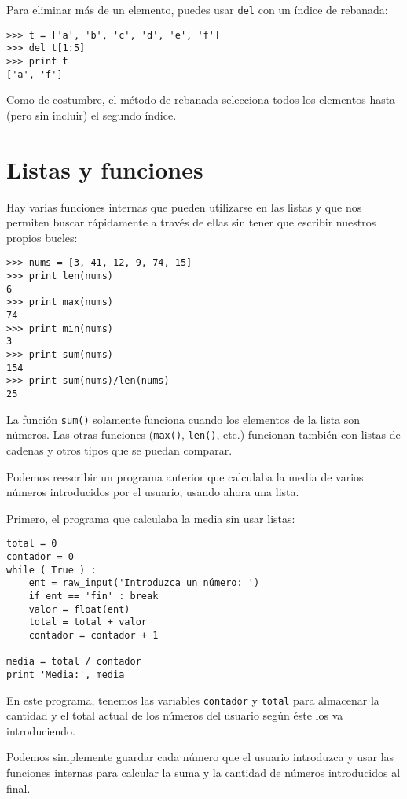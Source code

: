 Para eliminar más de un elemento, puedes usar {\tt del} con
un índice de rebanada:

\beforeverb
\begin{verbatim}
>>> t = ['a', 'b', 'c', 'd', 'e', 'f']
>>> del t[1:5]
>>> print t
['a', 'f']
\end{verbatim}
\afterverb
%
Como de costumbre, el método de rebanada selecciona todos los elementos hasta (pero
sin incluir) el segundo índice.

\section{Listas y funciones}

Hay varias funciones internas que pueden utilizarse en las listas
y que nos permiten buscar rápidamente a través de ellas
sin tener que escribir nuestros propios bucles:

\beforeverb
\begin{verbatim}
>>> nums = [3, 41, 12, 9, 74, 15]
>>> print len(nums)
6
>>> print max(nums)
74
>>> print min(nums)
3
>>> print sum(nums)
154
>>> print sum(nums)/len(nums)
25
\end{verbatim}
\afterverb
%
La función {\tt sum()} solamente funciona cuando los elementos de la lista son números.
Las otras funciones ({\tt max()}, {\tt len()}, etc.) funcionan también con listas
de cadenas y otros tipos que se puedan comparar.

Podemos reescribir un programa anterior que calculaba la media de
varios números introducidos por el usuario, usando ahora una lista.

Primero, el programa que calculaba la media sin usar listas:

\beforeverb
\begin{verbatim}
total = 0
contador = 0
while ( True ) :
    ent = raw_input('Introduzca un número: ')
    if ent == 'fin' : break
    valor = float(ent)
    total = total + valor
    contador = contador + 1

media = total / contador
print 'Media:', media
\end{verbatim}
\afterverb
%
En este programa, tenemos las variables {\tt contador} y {\tt total}
para almacenar la cantidad y el total actual de los números del usuario
según éste los va introduciendo.

Podemos simplemente guardar cada número que el usuario introduzca
y usar las funciones internas para calcular la suma y la cantidad
de números introducidos al final.

